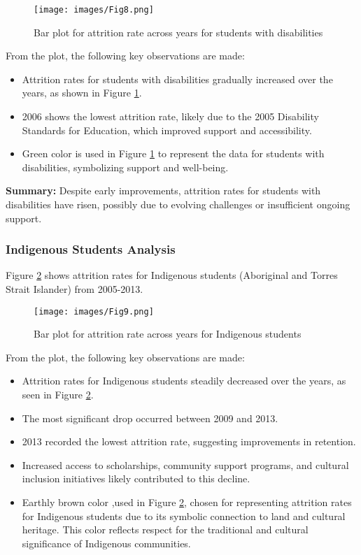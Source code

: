 \documentclass[conference]{IEEEtran}
\begin{document}
\begin{figure}[H] 
    \centering 
    \texttt{[image: images/Fig8.png]} 
    \caption{Bar plot for attrition rate across years for students with disabilities} 
    \label{fig:bar4} 
\end{figure}

\par From the plot, the following key observations are made:  \begin{itemize}
    \item Attrition rates for students with disabilities gradually increased over the years, as shown in Figure \ref{fig:bar4}. 
    \item 2006 shows the lowest attrition rate, likely due to the 2005 Disability Standards for Education, which improved support and accessibility. 
    \item Green color is used in Figure \ref{fig:bar4} to represent the data for students with disabilities, symbolizing support and well-being.
\end{itemize}

\textbf{Summary:} Despite early improvements, attrition rates for students with disabilities have risen, possibly due to evolving challenges or insufficient ongoing support.


\subsubsection{Indigenous Students Analysis}

Figure \ref{fig:bar5} shows attrition rates for Indigenous students (Aboriginal and Torres Strait Islander) from 2005-2013.

\begin{figure}[H] 
    \centering 
    \texttt{[image: images/Fig9.png]} 
    \caption{Bar plot for attrition rate across years for Indigenous students} 
    \label{fig:bar5}
\end{figure}

\par From the plot, the following key observations are made: \begin{itemize} 
    \item Attrition rates for Indigenous students steadily decreased over the years, as seen in Figure \ref{fig:bar5}.
    \item The most significant drop occurred between 2009 and 2013. 
    \item 2013 recorded the lowest attrition rate, suggesting improvements in retention. 
    \item Increased access to scholarships, community support programs, and cultural inclusion initiatives likely contributed to this decline.
    \item Earthly brown color ,used in Figure \ref{fig:bar5}, chosen for representing attrition rates for Indigenous students due to its symbolic connection to land and cultural heritage. This color reflects respect for the traditional and cultural significance of Indigenous communities.
\end{itemize}
\end{document}
